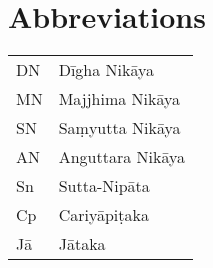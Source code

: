 \chapter*{Abbreviations}

\begin{tabular}{l l}
DN & Dīgha Nikāya\\
MN & Majjhima Nikāya\\
SN & Saṃyutta Nikāya\\
AN & Anguttara Nikāya\\
Sn & Sutta-Nipāta\\
Cp & Cariyāpiṭaka\\
Jā & Jātaka
\end{tabular}
